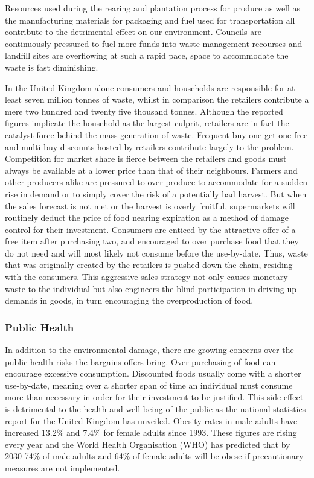 \documentclass[a4paper, 11pt]{article}
\begin{document}
Resources used during the rearing and plantation process for produce as well as the manufacturing materials for packaging and fuel used for transportation all contribute to the detrimental effect on our environment. Councils are continuously pressured to fuel more funds into waste management recourses and landfill sites are overflowing at such a rapid pace, space to accommodate the waste is fast diminishing.

In the United Kingdom alone consumers and households are responsible for at least seven million tonnes of waste, whilst in comparison the retailers contribute a mere two hundred and twenty five thousand tonnes. Although the reported figures implicate the household as the largest culprit, retailers are in fact the catalyst force behind the mass generation of waste. Frequent buy-one-get-one-free and multi-buy discounts hosted by retailers contribute largely to the problem. Competition for market share is fierce between the retailers and goods must always be available at a lower price than that of their neighbours. Farmers and other producers alike are pressured to over produce to accommodate for a sudden rise in demand or to simply cover the risk of a potentially bad harvest. But when the sales forecast is not met or the harvest is overly fruitful, supermarkets will routinely deduct the price of food nearing expiration as a method of damage control for their investment. 
Consumers are enticed by the attractive offer of a free item after purchasing two, and encouraged to over purchase food that they do not need and will most likely not consume before the use-by-date. Thus, waste that was originally created by the retailers is pushed down the chain, residing with the consumers. This aggressive sales strategy not only causes monetary waste to the individual but also engineers the blind participation in driving up demands in goods, in turn encouraging the overproduction of food. 


\subsubsection{Public Health}
In addition to the environmental damage, there are growing concerns over the public health risks the bargains offers bring. Over purchasing of food can encourage excessive consumption. Discounted foods usually come with a shorter use-by-date, meaning over a shorter span of time an individual must consume more than necessary in order for their investment to be justified. This side effect is detrimental to the health and well being of the public as the national statistics report for the United Kingdom has unveiled. Obesity rates in male adults have increased 13.2\% and 7.4\% for female adults since 1993. These figures are rising every year and the World Health Organisation (WHO) has predicted that by 2030 74\% of male adults and 64\% of female adults will be obese if precautionary measures are not implemented. 
\end{document}
